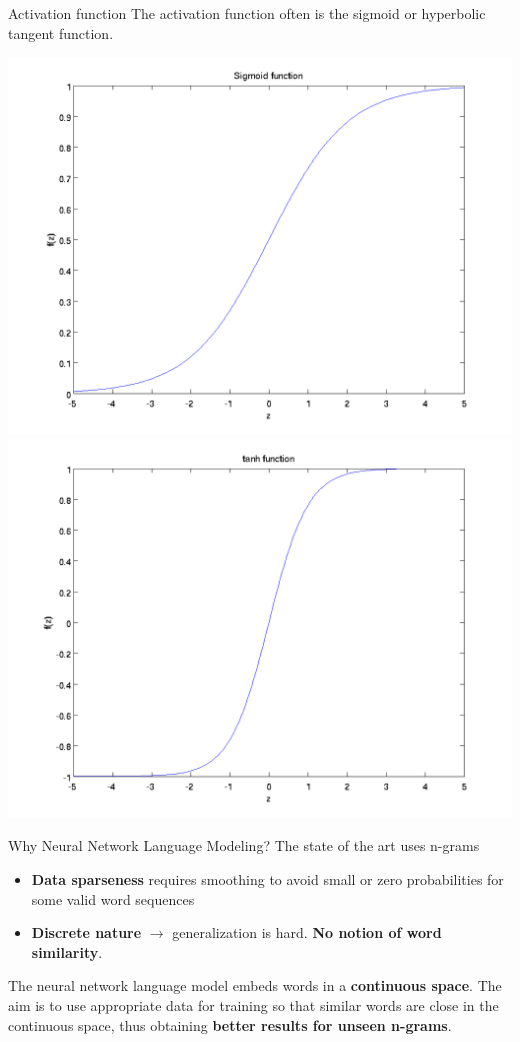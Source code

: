 \documentclass{beamer}
\begin{document}
\begin{frame}{Activation function}
	The activation function often is the sigmoid or hyperbolic tangent function.
	\begin{center}
		\includegraphics[scale=0.28]{images/sigmoid.png}
		\includegraphics[scale=0.28]{images/tanh.png}
	\end{center}
\end{frame}

\begin{frame}{Why Neural Network Language Modeling?}
	The state of the art uses n-grams
	\begin{itemize}
		\item \textbf{Data sparseness} requires smoothing to avoid small or zero probabilities for some valid word sequences
		\item \textbf{Discrete nature} $\rightarrow$ generalization is hard. \textbf{No notion of word similarity}.
	\end{itemize}
	\vspace{5mm}
	The neural network language model embeds words in a\textbf{ continuous space}. The aim is to use appropriate data for training so that similar words are close in the continuous space, thus obtaining \textbf{better results for unseen n-grams}.
\end{frame}
\end{document}

